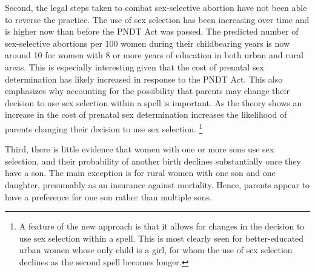 \documentclass[12pt,letterpaper]{article}
\begin{document}
Second, the legal steps taken to combat sex-selective abortion have not been able
to reverse the practice.
The use of sex selection has been increasing over time and is higher now than before the
PNDT Act was passed.
The predicted number of sex-selective abortions per 100 women during their childbearing 
years is now around 10 for women with 8 or more years of education in both urban and
rural areas.
This is especially interesting given that the cost of prenatal sex determination 
has likely increased in response to the PNDT Act.
This also emphasizes why accounting for the possibility that parents may change
their decision to use sex selection within a spell is important. 
As the theory shows an increase in the cost of prenatal sex determination 
increases the likelihood of parents changing their decision to use sex selection.%
\footnote{
A feature of the new approach is that it allows for changes in the decision 
to use sex selection within a spell.
This is most clearly seen for better-educated urban women whose only child is a girl, 
for whom the use of sex selection declines as the second spell becomes longer.
}


Third,  there is little evidence that women with one or more sons use sex selection,
and their probability of another birth declines substantially once they have a son.
The main exception is for rural women with one son and one daughter, presumably as an 
insurance against mortality.
Hence, parents appear to have a preference for one son rather than multiple sons.
\end{document}
